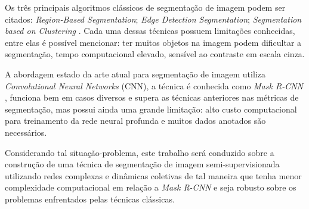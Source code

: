 Os três principais algoritmos clássicos de segmentação de imagem podem
ser citados: \textit{Region-Based Segmentation}; \textit{Edge Detection
  Segmentation}; \textit{Segmentation based on Clustering}
\cite{ImageSegmentationTechniques1985}. Cada uma dessas técnicas
possuem limitações conhecidas, entre elas é possível mencionar: ter
muitos objetos na imagem podem dificultar a segmentação, tempo
computacional elevado, sensível ao contraste em escala cinza.

A abordagem estado da arte atual para segmentação de imagem utiliza
\textit{Convolutional Neural Networks} (CNN), a técnica é conhecida
como \textit{Mask R-CNN} \cite{he2018mask}, funciona bem em casos
diversos e supera as técnicas anteriores nas métricas de segmentação,
mas possui ainda uma grande limitação: alto custo computacional para
treinamento da rede neural profunda e muitos dados anotados são necessários.

Considerando tal situação-problema, este trabalho será conduzido sobre
a construção de uma técnica de segmentação de imagem
semi-supervisionada utilizando redes complexas e dinâmicas coletivas
de tal maneira que tenha menor complexidade computacional em relação a
\textit{Mask R-CNN} e seja robusto sobre os problemas enfrentados pelas
técnicas clássicas.
